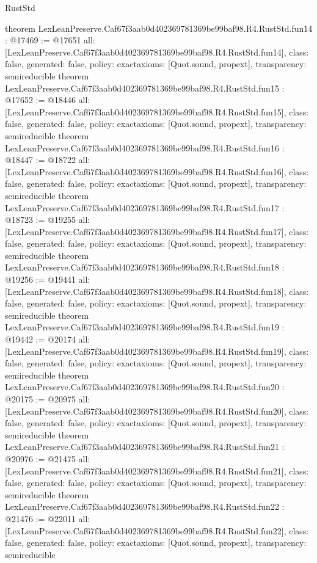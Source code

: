 \begin{lexlean}{RustStd}
\begin{coremodule}
{}
theorem LexLeanPreserve.Caf67f3aab0d402369781369be99baf98.R4.RustStd.fun14 : @17469 := @17651 {
  all: [LexLeanPreserve.Caf67f3aab0d402369781369be99baf98.R4.RustStd.fun14],
  class: false,
  generated: false,
  policy: exact{axioms: [Quot.sound, propext]},
  transparency: semireducible
}
theorem LexLeanPreserve.Caf67f3aab0d402369781369be99baf98.R4.RustStd.fun15 : @17652 := @18446 {
  all: [LexLeanPreserve.Caf67f3aab0d402369781369be99baf98.R4.RustStd.fun15],
  class: false,
  generated: false,
  policy: exact{axioms: [Quot.sound, propext]},
  transparency: semireducible
}
theorem LexLeanPreserve.Caf67f3aab0d402369781369be99baf98.R4.RustStd.fun16 : @18447 := @18722 {
  all: [LexLeanPreserve.Caf67f3aab0d402369781369be99baf98.R4.RustStd.fun16],
  class: false,
  generated: false,
  policy: exact{axioms: [Quot.sound, propext]},
  transparency: semireducible
}
theorem LexLeanPreserve.Caf67f3aab0d402369781369be99baf98.R4.RustStd.fun17 : @18723 := @19255 {
  all: [LexLeanPreserve.Caf67f3aab0d402369781369be99baf98.R4.RustStd.fun17],
  class: false,
  generated: false,
  policy: exact{axioms: [Quot.sound, propext]},
  transparency: semireducible
}
theorem LexLeanPreserve.Caf67f3aab0d402369781369be99baf98.R4.RustStd.fun18 : @19256 := @19441 {
  all: [LexLeanPreserve.Caf67f3aab0d402369781369be99baf98.R4.RustStd.fun18],
  class: false,
  generated: false,
  policy: exact{axioms: [Quot.sound, propext]},
  transparency: semireducible
}
theorem LexLeanPreserve.Caf67f3aab0d402369781369be99baf98.R4.RustStd.fun19 : @19442 := @20174 {
  all: [LexLeanPreserve.Caf67f3aab0d402369781369be99baf98.R4.RustStd.fun19],
  class: false,
  generated: false,
  policy: exact{axioms: [Quot.sound, propext]},
  transparency: semireducible
}
theorem LexLeanPreserve.Caf67f3aab0d402369781369be99baf98.R4.RustStd.fun20 : @20175 := @20975 {
  all: [LexLeanPreserve.Caf67f3aab0d402369781369be99baf98.R4.RustStd.fun20],
  class: false,
  generated: false,
  policy: exact{axioms: [Quot.sound, propext]},
  transparency: semireducible
}
theorem LexLeanPreserve.Caf67f3aab0d402369781369be99baf98.R4.RustStd.fun21 : @20976 := @21475 {
  all: [LexLeanPreserve.Caf67f3aab0d402369781369be99baf98.R4.RustStd.fun21],
  class: false,
  generated: false,
  policy: exact{axioms: [Quot.sound, propext]},
  transparency: semireducible
}
theorem LexLeanPreserve.Caf67f3aab0d402369781369be99baf98.R4.RustStd.fun22 : @21476 := @22011 {
  all: [LexLeanPreserve.Caf67f3aab0d402369781369be99baf98.R4.RustStd.fun22],
  class: false,
  generated: false,
  policy: exact{axioms: [Quot.sound, propext]},
  transparency: semireducible
}
\end{coremodule}
\end{lexlean}
